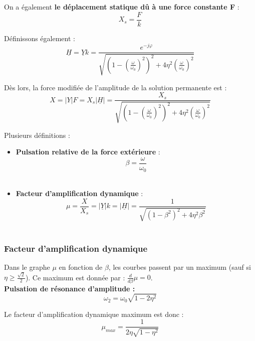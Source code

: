 \documentclass[../main.tex]{subfiles}
\begin{document}
On a également \textbf{le déplacement statique dû à une force constante F} : \begin{equation}
    X_s = \frac{F}{k}
\end{equation}

Définissons également : \begin{equation}
    \underline{H} = \underline{Y} k = \frac{e^{-j\varphi}}{\sqrt{(1-(\frac{\omega}{\omega_0})^2)^2+ 4\eta^2 (\frac{\omega}{\omega_0})^2}}
\end{equation}

Dès lors, la force modifiée de l'amplitude de la solution permanente est : \begin{equation}
    X = \lvert Y \rvert F = X_s \lvert \underline{H} \rvert  = \frac{X_s}{\sqrt{(1-(\frac{\omega}{\omega_0})^2)^2+ 4\eta^2 (\frac{\omega}{\omega_0})^2}}
\end{equation}

Plusieurs définitions : \begin{itemize}
    \item \textbf{Pulsation relative de la force extérieure} : \begin{equation}
        \beta = \frac{\omega}{\omega_0}
    \end{equation}\\
    \item \textbf{Facteur d'amplification dynamique} : \begin{equation}
        \mu = \frac{X}{X_s} = \lvert \underline{Y} \rvert k = \lvert \underline{H} \rvert = \frac{1}{\sqrt{(1-\beta^2)^2+4\eta^2\beta^2}}
    \end{equation}\\
\end{itemize}

\subsubsection{Facteur d'amplification dynamique}

Dans le graphe $\mu$ en fonction de $\beta$, les courbes passent par un maximum (sauf si $\eta \geq \frac{\sqrt{2}}{2}$). Ce maximum est donnée par : $\frac{d}{d\beta} \mu = 0$.\\

\textbf{Pulsation de résonance d'amplitude :} \begin{equation}
    \omega_2 = \omega_0 \sqrt{1-2\eta^2}
\end{equation}

Le facteur d'amplification dynamique maximum est donc : \begin{equation}
    \mu_{max} = \frac{1}{2\eta \sqrt{1-\eta^2}}
\end{equation}
\end{document}
